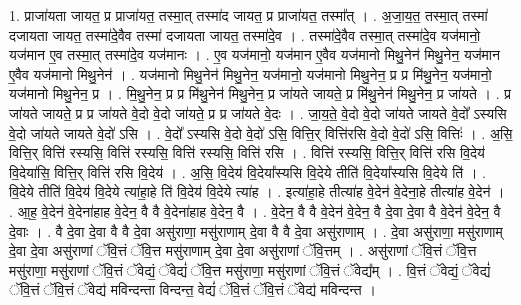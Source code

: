 \documentclass[17pt]{extarticle}
\begin{document}
1. प्राजा॑यता जायत॒ प्र प्राजा॑यत॒ तस्मा॒त् तस्मा॑द जायत॒ प्र प्राजा॑यत॒ तस्मा᳚त् । . अ॒जा॒य॒त॒ तस्मा॒त् तस्मा॑ दजायता जायत॒ तस्मा॑दे॒वैव तस्मा॑ दजायता जायत॒ तस्मा॑दे॒व । . तस्मा॑दे॒वैव तस्मा॒त् तस्मा॑दे॒व यज॑मानो॒ यज॑मान ए॒व तस्मा॒त् तस्मा॑दे॒व यज॑मानः । . ए॒व यज॑मानो॒ यज॑मान ए॒वैव यज॑मानो मिथु॒नेन॑ मिथु॒नेन॒ यज॑मान ए॒वैव यज॑मानो मिथु॒नेन॑ । . यज॑मानो मिथु॒नेन॑ मिथु॒नेन॒ यज॑मानो॒ यज॑मानो मिथु॒नेन॒ प्र प्र मि॑थु॒नेन॒ यज॑मानो॒ यज॑मानो मिथु॒नेन॒ प्र । . मि॒थु॒नेन॒ प्र प्र मि॑थु॒नेन॑ मिथु॒नेन॒ प्र जा॑यते जायते॒ प्र मि॑थु॒नेन॑ मिथु॒नेन॒ प्र जा॑यते । . प्र जा॑यते जायते॒ प्र प्र जा॑यते वे॒दो वे॒दो जा॑यते॒ प्र प्र जा॑यते वे॒दः । . जा॒य॒ते॒ वे॒दो वे॒दो जा॑यते जायते वे॒दो᳚ ऽस्यसि वे॒दो जा॑यते जायते वे॒दो॑ ऽसि । . वे॒दो᳚ ऽस्यसि वे॒दो वे॒दो॑ ऽसि॒ वित्ति॒र् वित्ति॑रसि वे॒दो वे॒दो॑ ऽसि॒ वित्तिः॑ । . अ॒सि॒ वित्ति॒र् वित्ति॑ रस्यसि॒ वित्ति॑ रस्यसि॒ वित्ति॑ रस्यसि॒ वित्ति॑ रसि । . वित्ति॑ रस्यसि॒ वित्ति॒र् वित्ति॑ रसि वि॒देय॑ वि॒देया॑सि॒ वित्ति॒र् वित्ति॑ रसि वि॒देय॑ । . अ॒सि॒ वि॒देय॑ वि॒देया᳚स्यसि वि॒देये तीति॑ वि॒देया᳚स्यसि वि॒देये ति॑ । . वि॒देये तीति॑ वि॒देय॑ वि॒देये त्या॑हा॒हे ति॑ वि॒देय॑ वि॒देये त्या॑ह । . इत्या॑हा॒हे तीत्या॑ह वे॒देन॑ वे॒देना॒हे तीत्या॑ह वे॒देन॑ । . आ॒ह॒ वे॒देन॑ वे॒देना॑हाह वे॒देन॒ वै वै वे॒देना॑हाह वे॒देन॒ वै । . वे॒देन॒ वै वै वे॒देन॑ वे॒देन॒ वै दे॒वा दे॒वा वै वे॒देन॑ वे॒देन॒ वै दे॒वाः । . वै दे॒वा दे॒वा वै वै दे॒वा असु॑राणा॒ मसु॑राणाम् दे॒वा वै वै दे॒वा असु॑राणाम् । . दे॒वा असु॑राणा॒ मसु॑राणाम् दे॒वा दे॒वा असु॑राणां ॅवि॒त्तं ॅवि॒त्त मसु॑राणाम् दे॒वा दे॒वा असु॑राणां ॅवि॒त्तम् । . असु॑राणां ॅवि॒त्तं ॅवि॒त्त मसु॑राणा॒ मसु॑राणां ॅवि॒त्तं ॅवेद्यं॒ ॅवेद्यं॑ ॅवि॒त्त मसु॑राणा॒ मसु॑राणां ॅवि॒त्तं ॅवेद्य᳚म् । . वि॒त्तं ॅवेद्यं॒ ॅवेद्यं॑ ॅवि॒त्तं ॅवि॒त्तं ॅवेद्य॑ मविन्दन्ता विन्दन्त॒ वेद्यं॑ ॅवि॒त्तं ॅवि॒त्तं ॅवेद्य॑ मविन्दन्त । \newline
\end{document}
